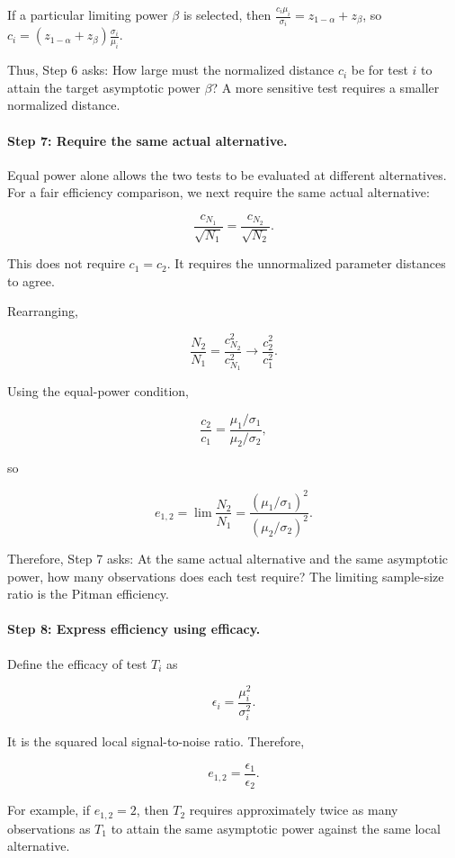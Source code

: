 If a particular limiting power $\beta$ is selected, then $\frac{c_i\mu_i}{\sigma_i}=z_{1-\alpha}+z_\beta$, so $c_i=\left(z_{1-\alpha}+z_\beta\right)\frac{\sigma_i}{\mu_i}$.

Thus, Step 6 asks: How large must the normalized distance $c_i$ be for test $i$ to attain the target asymptotic power $\beta$? A more sensitive test requires a smaller normalized distance.

\paragraph{Step 7: Require the same actual alternative.}

Equal power alone allows the two tests to be evaluated at different alternatives. For a fair efficiency comparison, we next require the same actual alternative:

\[
\frac{c_{N_1}}{\sqrt{N_1}}
=
\frac{c_{N_2}}{\sqrt{N_2}}.
\]

This does not require $c_1=c_2$. It requires the unnormalized parameter distances to agree.

Rearranging,

\[
\frac{N_2}{N_1}
=
\frac{c_{N_2}^2}{c_{N_1}^2}
\longrightarrow
\frac{c_2^2}{c_1^2}.
\]

Using the equal-power condition,

\[
\frac{c_2}{c_1}
=
\frac{\mu_1/\sigma_1}{\mu_2/\sigma_2},
\]

so

\[
e_{1,2}
=
\lim\frac{N_2}{N_1}
=
\frac{(\mu_1/\sigma_1)^2}
     {(\mu_2/\sigma_2)^2}.
\]

Therefore, Step 7 asks: At the same actual alternative and the same asymptotic power, how many observations does each test require? The limiting sample-size ratio is the Pitman efficiency.

\paragraph{Step 8: Express efficiency using efficacy.}

Define the efficacy of test $T_i$ as

\[
\epsilon_i
=
\frac{\mu_i^2}{\sigma_i^2}.
\]

It is the squared local signal-to-noise ratio. Therefore,

\[
e_{1,2}
=
\frac{\epsilon_1}{\epsilon_2}.
\]


For example, if $e_{1,2}=2$, then $T_2$ requires approximately twice as many observations as $T_1$ to attain the same asymptotic power against the same local alternative.

